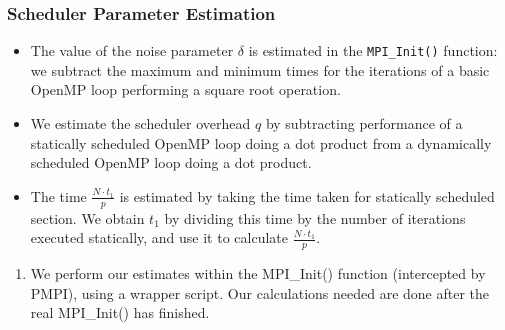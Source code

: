 \begin{frame}[label=runtimeparameterestimation]
\frametitle{Scheduler Parameter Estimation}
\begin{itemize}
\small \item \small The value of the noise parameter $\delta$ is 
estimated in the \texttt{MPI\_Init()} function: we subtract the
maximum and minimum times for the iterations of a basic OpenMP loop
performing a square root operation. 
\item \small We estimate the scheduler overhead $q$ by subtracting 
performance of a statically scheduled OpenMP loop doing a dot product
from a dynamically scheduled OpenMP loop doing a dot product.  
\item \small The time $\frac{N \cdot t_1}{p}$ is estimated by taking 
the time taken for statically scheduled section. 
  We 
obtain $t_1$ by dividing this time by the number of iterations
executed statically, and use it to calculate $\frac{N\cdot t_1}{p}$.  

\end{itemize}
\begin{enumerate}
\tiny \item \tiny We perform our estimates within the MPI\_Init() 
function (intercepted by PMPI), using a wrapper script. Our calculations needed are done
after the real MPI\_Init() has finished. 
\end{enumerate}
\end{frame}

